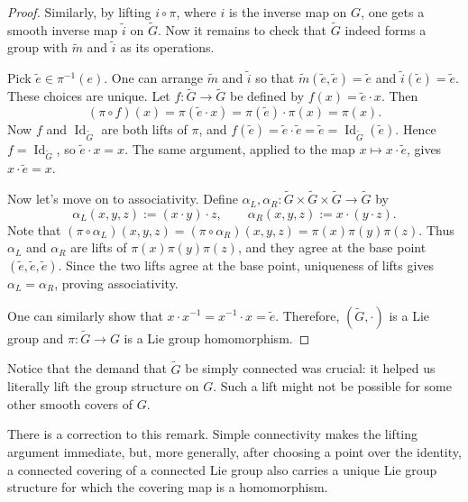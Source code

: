 \documentclass[11pt,a4paper]{article}
\begin{document}
\begin{proof}
Similarly, by lifting $i\circ\pi$, where $i$ is the inverse map on $G$,
one gets a smooth inverse map $\widetilde i$ on $\widetilde G$. Now it
remains to check that $\widetilde G$ indeed forms a group with
$\widetilde m$ and $\widetilde i$ as its operations.

Pick $\widetilde e\in\pi^{-1}(e)$. One can arrange $\widetilde m$ and
$\widetilde i$ so that $\widetilde m(\widetilde e,\widetilde e)=\widetilde e$
and $\widetilde i(\widetilde e)=\widetilde e$. These choices are unique. Let $f\colon\widetilde G\to\widetilde G$ be
defined by $f(x)=\widetilde e\cdot x$. Then
\[
  (\pi\circ f)(x)=\pi(\widetilde e\cdot x)
  =\pi(\widetilde e)\cdot\pi(x)=\pi(x).
\]
Now $f$ and $\operatorname{Id}_{\widetilde G}$ are both lifts of $\pi$,
and $f(\widetilde e)=\widetilde e\cdot\widetilde e=\widetilde e
=\operatorname{Id}_{\widetilde G}(\widetilde e)$. Hence
$f=\operatorname{Id}_{\widetilde G}$, so $\widetilde e\cdot x=x$.
The same argument, applied to the map $x\mapsto x\cdot\widetilde e$, gives
$x\cdot\widetilde e=x$.

Now let's move on to associativity. Define
$\alpha_L,\alpha_R\colon\widetilde G\times\widetilde G\times\widetilde G
\to\widetilde G$ by
\[
  \alpha_L(x,y,z):=(x\cdot y)\cdot z,
  \qquad \alpha_R(x,y,z):=x\cdot(y\cdot z).
\]
Note that $(\pi\circ\alpha_L)(x,y,z)=(\pi\circ\alpha_R)(x,y,z)
=\pi(x)\pi(y)\pi(z)$. Thus $\alpha_L$ and $\alpha_R$ are lifts of
$\pi(x)\pi(y)\pi(z)$, and they agree at the base point
$(\widetilde e,\widetilde e,\widetilde e)$. Since the two lifts agree at the base point, uniqueness of lifts gives $\alpha_L=\alpha_R$, proving associativity.

One can similarly show that $x\cdot x^{-1}=x^{-1}\cdot x=\widetilde e$.
Therefore, $(\widetilde G,\cdot)$ is a Lie group and
$\pi\colon\widetilde G\to G$ is a Lie group homomorphism.
\end{proof}

\begin{remark}
Notice that the demand that $\widetilde G$ be simply connected was crucial: it helped us literally lift the group structure on $G$. Such a lift might not be possible for some other smooth covers of $G$.

There is a correction to this remark. Simple connectivity makes the lifting argument immediate, but, more generally,
after choosing a point over the identity, a connected covering of a connected
Lie group also carries a unique Lie group structure for which the covering
map is a homomorphism.
\end{remark}
\end{document}
